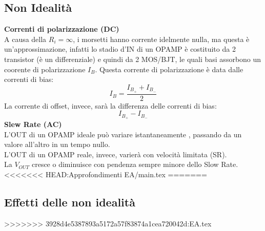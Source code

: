 \documentclass{article}
\begin{document}
\subsection{Non Idealità}
\textbf{Correnti di polarizzazione (DC)}\\
A causa della $R_{i}=\infty$, i morsetti hanno corrente idelmente nulla, ma questa è un'approssimazione, infatti lo stadio d'IN di un OPAMP è costituito da 2 transistor (è un differenziale) e quindi da 2 MOS/BJT, le quali basi assorbono un coorente di polarizzazione $I_{B}$.
Questa corrente di polarizzazione è data dalle correnti di bias:
\begin{equation}
    I_{B}=\frac{I_{B_{+}}+I_{B_{-}}}{2}
\end{equation}
La corrente di offset, invece, sarà la differenza delle correnti di bias:
\begin{equation}
    I_{B_{+}}-I_{B_{-}}
\end{equation}
\textbf{Slew Rate (AC)}\\
L'OUT di un OPAMP ideale può variare istantaneamente , passando da un valore all'altro in un tempo nullo.\\
L'OUT di un OPAMP reale, invece, varierà con velocità limitata (SR).\\
La $V_{OUT}$ cresce o diminuisce con pendenza sempre minore dello Slow Rate.
<<<<<<< HEAD:Approfondimenti EA/main.tex
=======
\subsection{Effetti delle non idealità}
>>>>>>> 3928d4e5387893a5172a57f83874a1cea720042d:EA.tex
\end{document}

